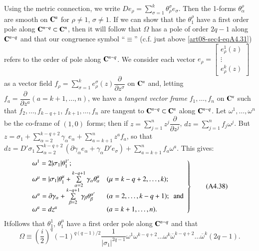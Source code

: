 Using the metric connection, we write $De_{\rho}=\sum\limits^{k}_{\sigma=1}\theta^{\sigma}_{\rho}e_{\sigma}$. Then the 1-forms $\theta^{\rho}_{\alpha}$ are smooth on $\mathbf{C}^{n}$ for $\rho\neq 1$, $\sigma\neq 1$. If we can show that the $\theta^{\rho}_{1}$ have a first order pole along $\mathbf{C}^{n-q}\subset \mathbf{C}^{n}$, then it will follow that $\Omega$ has a pole of order $2q-1$ along $\mathbf{C}^{n-q}$ and that our congruence symbol ``$\equiv$'' (c.f. just above \eqref{art08-sec4-eqA4.31}) refers to the order of pole along $\mathbf{C}^{n-q}$. We consider each vector $e_{\rho}=\left[\begin{smallmatrix} e^{1}_{\rho}(z)\\\vdots\\e^{k}_{\rho}(z)\end{smallmatrix}\right]$ as a vector field $f_{\rho}=\sum\limits^{k}_{\sigma=1}e^{\sigma}_{\rho}(z)\dfrac{\partial}{\partial z^{\sigma}}$ on $\mathbf{C}^{n}$ and, letting $f_{a}=\dfrac{\partial}{\partial z^{a}}(a=k+1,\ldots,n)$, we have a {\em tangent vector frame} $f_{1},\ldots,f_{n}$ on $\mathbf{C}^{n}$ such that $f_{2},\ldots,f_{k-q+1}$, $f_{k+1},\ldots,f_{n}$ are tangent to $\mathbf{C}^{n-q}\subset \mathbf{C}^{n}$ along $\mathbf{C}^{n-q}$. Let $\omega^{1},\ldots,\omega^{n}$ be the co-frame of $(1,0)$ forms; then if $z=\sum\limits^{n}_{j=1}z^{j}\dfrac{\partial}{\partial z^{j}}$, $dz=\sum\limits^{n}_{j=1}f_{j}\omega^{j}$. But $z=\sigma_{1}+\sum\limits^{k-q+2}_{\alpha=2}\gamma_{\alpha}e_{\alpha}+\sum\limits^{n}_{a=k+1}z^{a}f_{a}$, so that $dz=D'\sigma_{1}\sum\limits^{k-q+2}_{\alpha=2}(\partial \gamma_{\alpha}e_{\alpha}+\gamma_{\alpha}D'e_{\sigma})+\sum\limits^{n}_{a=k+1}f_{a}\omega^{a}$. This gives:
\begin{equation*}
\left.
\begin{array}{@{}ll}
\omega^{1}=2|\sigma_{1}|\theta^{1'}_{1}; & \\[4pt]
\omega^{\mu}=|\sigma_{1}|\theta^{\mu}_{1}+\sum\limits^{k-q+1}_{\alpha=2}\gamma_{\alpha}\theta^{\mu}_{\alpha} & (\mu=k-q+2,\ldots,k);\\[4pt]
\omega^{\alpha}=\partial \gamma_{\alpha}+\sum\limits^{k-q+1}_{\beta=2}\gamma_{\beta}\theta^{\alpha'}_{\beta} & (\alpha=2,\ldots,k-q+1);\text{~ and}\\
\omega^{a}= dz^{a} & (a=k+1,\ldots,n).
\end{array}
\right\}\tag{A4.38}\label{art08-sec4-eqA4.38}
\end{equation*}
It\pageoriginale follows that $\theta^{1}_{1}$, $\theta^{\mu}_{1}$ have a first order pole along $\mathbf{C}^{n-q}$ and that 
\begin{equation*}
\Omega\equiv \left(\dfrac{i}{2}\right)^{q}(-1)^{q(q-1)/2}\dfrac{1}{|\sigma_{1}|^{2q-1}}\omega^{1}\omega^{k-q+2}\ldots\omega^{k}\overline{\omega}^{k-q+2}\ldots\overline{\omega}^{k}(2q-1).\tag{A4.39}\label{art08-sec4-eqA4.39}
\end{equation*}

